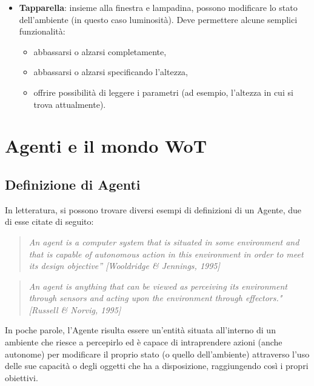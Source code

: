 \documentclass[12pt,a4paper,openright,oneside]{report}
\begin{document}
\begin{itemize}
	\item \textbf{Tapparella}: insieme alla finestra e lampadina, possono modificare lo stato dell'ambiente (in questo caso luminosità). Deve permettere alcune semplici funzionalità:
	\begin{itemize}
		\setlength\itemsep{-0.0em}
		\item abbassarsi o alzarsi completamente,
		\item abbassarsi o alzarsi specificando l'altezza,
		\item offrire possibilità di leggere i parametri (ad esempio, l'altezza in cui si trova attualmente).
	\end{itemize}
\end{itemize}


 


\clearpage{\pagestyle{empty}\cleardoublepage}
\chapter{Agenti e il mondo WoT}           %
\lhead[\fancyplain{}{\bfseries\thepage}]{\fancyplain{}{\bfseries\rightmark}}  

\section{Definizione di Agenti}
In letteratura, si possono trovare diversi esempi di definizioni di un Agente, due di esse citate di seguito:

\begin{quotation}
	\textit{
	An agent is a computer system that is situated in some
	environment and that is capable of autonomous action in
	this environment in order to meet its design
	objective” [Wooldridge \& Jennings, 1995]}
\end{quotation}

\begin{quotation}
	\textit{
	An agent is anything that can be viewed as perceiving its
	environment through sensors and acting upon the
	environment through effectors." [Russell \& Norvig, 1995]}
\end{quotation}

In poche parole, l'Agente risulta essere un'entità situata all'interno di un ambiente che riesce a percepirlo ed è capace di intraprendere azioni (anche autonome) per modificare il proprio stato (o quello dell'ambiente) attraverso l'uso delle sue capacità o degli oggetti che ha a disposizione, raggiungendo così i propri obiettivi.\\
\end{document}
